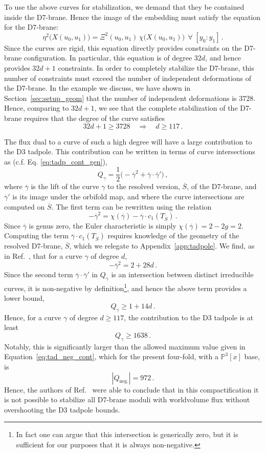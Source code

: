 \documentclass[a4paper,12pt]{article}
\numberwithin{equation}{section}
\newcommand{\mbb}{\mathbb}
\newcommand{\be}{\begin{equation}}
\newcommand{\ee}{\end{equation}}
\newcommand{\dbl}{\overline{S}}		%
\newcommand{\crv}{\gamma}			%
\newcommand{\crvl}{\overline{\gamma}}	%
\newcommand{\flxcont}[1]{Q_{#1}}		%
\newcommand{\tanb}[1]{T_{#1}}			%
\begin{document}
To use the above curves for stabilization, we demand that they be contained inside the D7-brane. Hence the image of the embedding must satisfy the equation for the D7-brane:
\be
\eta^2\big(X(u_0,u_1)\big) = \Xi^2(u_0,u_1)\,\chi\big(X(u_0,u_1)\big) ~~ \forall \;[y_0:y_1]\,.
\ee
Since the curves are rigid, this equation directly provides constraints on the D7-brane configuration. In particular, this equation is of degree $32d$, and hence provides $32d+1$ constraints.
In order to completely stabilize the D7-brane, this number of constraints must exceed the number of independent deformations of the D7-brane. In the example we discuss, we have shown in Section~\ref{sec:setup_geom} that the number of independent deformations is 3728. Hence, comparing to $32d+1$, we see that the complete stabilization of the D7-brane requires that the degree of the curve satisfies
\be
32d+1\ge 3728 \quad \Rightarrow  \quad d  \geq 117 \,.
\label{eq:mod_stab_p3}
\ee

\bigskip

The flux dual to a curve of such a high degree will have a large contribution to the D3 tadpole. This contribution can be written in terms of curve intersections as (c.f. Eq. \eqref{eq:tadp_cont_gen}),
\be
\flxcont{\crv} = \frac{1}{2}\big(-\crvl^2 + \crvl \cdot \crvl'\big) \,,
\ee
where $\crvl$ is the lift of the curve $\crv$ to the resolved version, $\dbl$, of the D7-brane, and $\crvl'$ is its image under the orbifold map, and where the curve intersections are computed on $\dbl$. The first term can be rewritten using the relation
\be
-\crvl^2 = \chi(\crvl)-\crvl \cdot c_1(\tanb{\dbl}) \,.
\ee
Since $\crvl$ is genus zero, the Euler characteristic is simply $\chi(\crvl) = 2-2g = 2$. Computing  the term $\crvl \cdot c_1(\tanb{\dbl})$ requires knowledge of the geometry of the resolved D7-brane, $\dbl$, which we relegate to Appendix~\ref{app:tadpole}. We find, as in Ref.~\cite{Collinucci:2008pf}, that for a curve $\crv$ of degree $d$,
\be
-\crvl^2 = 2 + 28d \,.
\ee
Since the second term $\crvl \cdot \crvl'$ in $\flxcont{\crv}$ is an intersection between distinct irreducible curves, it is non-negative by definition\footnote{In fact one can argue that this intersection is generically zero, but it is sufficient for our purposes that it is always non-negative.}, and hence the above term provides a lower bound,
\be
\flxcont{\crv} \geq 1 + 14d\,. 
\label{eq:tadp_cont_simpl_ex}
\ee
Hence, for a curve $\crv$ of degree $d \geq 117$, the contribution to the D3 tadpole is at least
\be
\flxcont{\crv} \geq 1638 \,.
\ee
Notably, this is significantly larger than the allowed maximum value given in Equation~\eqref{eq:tad_neg_cont}, which for the present four-fold, with a $\mbb{P}^3[x]$ base, is
\be
|Q_\mathrm{neg.}| = 972 \, . 
\ee
Hence, the authors of Ref.~\cite{Collinucci:2008pf} were able to conclude that in this compactification it is not possible to stabilize all D7-brane moduli with worldvolume flux without overshooting the D3 tadpole bounds.
\end{document}
